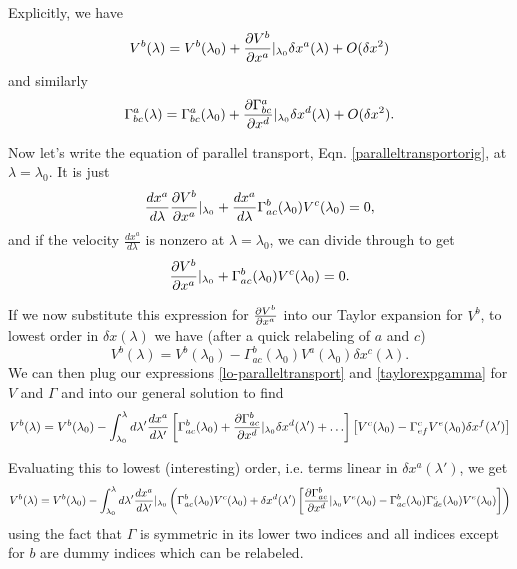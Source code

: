 Explicitly, we have
\begin{equation}\label{taylorexpv}
    V^b(\lambda)=V^b(\lambda_0) + \frac{\p V^b}{\p x^a}|_{\lambda_0} \delta x^a(\lambda)+O(\delta x^2)
\end{equation}
and similarly
\begin{equation}\label{taylorexpgamma}
  \Gamma^a_{bc}(\lambda)=\Gamma^a_{bc}(\lambda_0)+\frac{\p \Gamma^a_{bc}}{\p x^d}|_{\lambda_0}\delta x^d(\lambda)+O(\delta x^2).  
\end{equation}

Now let's write the equation of parallel transport, Eqn. \ref{paralleltransportorig}, at $\lambda=\lambda_0.$ It is just %
$$\frac{dx^a}{d\lambda}\frac{\p V^b}{\p x^a}|_{\lambda_0}+\frac{dx^a}{d\lambda}\Gamma^b_{ac}(\lambda_0)V^c(\lambda_0)=0,$$
and if the velocity $\frac{dx^a}{d\lambda}$ is nonzero at $\lambda=\lambda_0$, we can divide through to get%
$$\frac{\p V^b}{\p x^a}|_{\lambda_0}+\Gamma^b_{ac}(\lambda_0)V^c(\lambda_0)=0.$$

If we now substitute this expression for $\P{V^b}{x^a}$ into our Taylor expansion for $V^b$, to lowest order in $\delta x(\lambda)$ we have (after a quick relabeling of $a$ and $c$)
\begin{equation}\label{lo-paralleltransport}
V^b(\lambda)=V^b(\lambda_0)-\Gamma^b_{ac}(\lambda_0)V^a(\lambda_0)\delta x^c(\lambda).
\end{equation}
We can then plug our expressions \ref{lo-paralleltransport} and \ref{taylorexpgamma} for $V$ and $\Gamma$ and into our general solution to find
$$V^b(\lambda)=V^b(\lambda_0) - \int_{\lambda_0}^\lambda d\lambda' \frac{dx^a}{d\lambda'}\left[\Gamma^b_{ac}(\lambda_0)+\frac{\p \Gamma^b_{ac}}{\p x^d}|_{\lambda_0} \delta x^d(\lambda')+\ldots\right]\left[V^c(\lambda_0)-\Gamma^c_{ef} V^e(\lambda_0)\delta x^f(\lambda')\right]$$

Evaluating this to lowest (interesting) order, i.e. terms linear in $\delta x^a(\lambda')$, we get
$$V^b(\lambda)=V^b(\lambda_0)
-\int_{\lambda_0}^\lambda d\lambda' \frac{dx^a}{d\lambda'}|_{\lambda_0}
\left(\Gamma^b_{ac}(\lambda_0)V^c(\lambda_0)
+\delta x^d(\lambda')\left[\frac{\p \Gamma^b_{ae}}{\p x^d}|_{\lambda_0} V^e(\lambda_0)-\Gamma^b_{ac}(\lambda_0)\Gamma^c_{de}(\lambda_0)V^e(\lambda_0)\right]\right)$$
using the fact that $\Gamma$ is symmetric in its lower two indices and all indices except for $b$ are dummy indices which can be relabeled.

